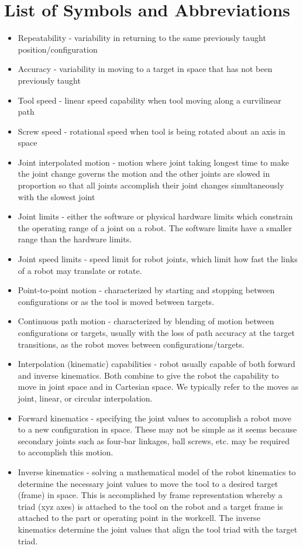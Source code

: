 \section{List of Symbols and Abbreviations}
\begin{itemize}
\item 	Repeatability - variability in returning to the same previously taught position/configuration
\item Accuracy - variability in moving to a target in space that has not been previously taught
\item Tool speed - linear speed capability when tool moving along a curvilinear path
\item Screw speed - rotational speed when tool is being rotated about an axis in space
\item Joint interpolated motion - motion where joint taking longest time to make the joint change governs the motion and the other joints are slowed in proportion so that all joints accomplish their joint changes simultaneously with the slowest joint
\item Joint limits - either the software or physical hardware limits which constrain the operating range of a joint on a robot. The software limits have a smaller range than the hardware limits.
\item Joint speed limits - speed limit for robot joints, which limit how fast the links of a robot may translate or rotate.
\item Point-to-point motion - characterized by starting and stopping between configurations or as the tool is moved between targets.
\item Continuous path motion - characterized by blending of motion between configurations or targets, usually with the loss of path accuracy at the target transitions, as the robot moves between configurations/targets.
\item Interpolation (kinematic) capabilities - robot usually capable of both forward and inverse kinematics. Both combine to give the robot the capability to move in joint space and in  Cartesian space. We typically refer to the moves as joint, linear, or circular interpolation.
\item Forward kinematics - specifying the joint values to accomplish a robot move to a new configuration in space. These may not be simple as it seems because secondary joints such as four-bar linkages, ball screws, etc. may be required to accomplish this motion.
\item Inverse kinematics - solving a mathematical model of the robot kinematics to determine the necessary joint values to move the tool to a desired target (frame) in space. This is accomplished by frame representation whereby a triad (xyz axes) is attached to the tool on the robot and a target frame is attached to the part or operating point in the workcell. The inverse kinematics determine the joint values that align the tool triad with the target triad.

\end{itemize}
